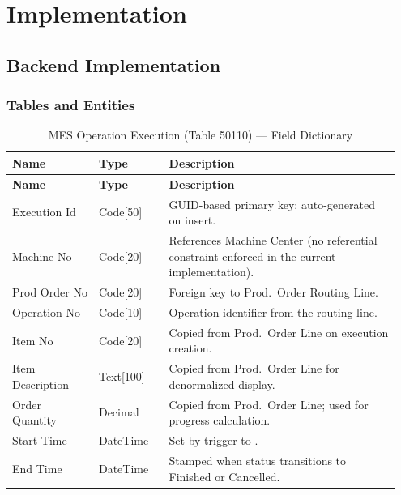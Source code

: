 \section{Implementation}

\subsection{Backend Implementation}
\subsubsection*{Tables and Entities}

\begin{longtable}{@{} P{0.21\linewidth} P{0.17\linewidth} P{0.57\linewidth} @{}}
	\caption{MES Operation Execution (Table 50110) --- Field Dictionary}
	\label{tab:s3-table-execution} \\
	\toprule
	\textbf{Name} & \textbf{Type} & \textbf{Description} \\
	\midrule
	\endfirsthead
	\toprule
	\textbf{Name} & \textbf{Type} & \textbf{Description} \\
	\midrule
	\endhead
	
	
	\bottomrule
	\endlastfoot
	
	Execution Id & Code[50] & GUID-based primary key; auto-generated on insert. \\
	\midrule
	Machine No & Code[20] & References Machine Center (no referential constraint enforced in the current implementation). \\
	\midrule
	Prod Order No & Code[20] & Foreign key to Prod.\ Order Routing Line. \\
	\midrule
	Operation No & Code[10] & Operation identifier from the routing line. \\
	\midrule
	Item No & Code[20] & Copied from Prod.\ Order Line on execution creation. \\
	\midrule
	Item Description & Text[100] & Copied from Prod.\ Order Line for denormalized display. \\
	\midrule
	Order Quantity & Decimal & Copied from Prod.\ Order Line; used for progress calculation. \\
	\midrule
	Start Time & DateTime & Set by  trigger to . \\
	\midrule
	End Time & DateTime & Stamped when status transitions to Finished or Cancelled. \\
\end{longtable}

